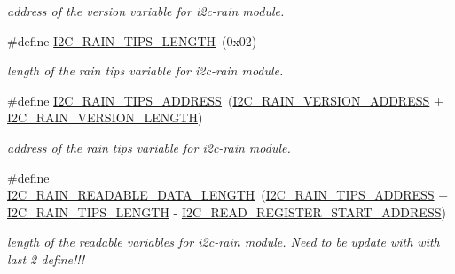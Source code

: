 \begin{DoxyCompactItemize}
\begin{DoxyCompactList}\small\item\em address of the version variable for i2c-\/rain module. \end{DoxyCompactList}\item 
\mbox{\label{registers-rain_8h_a2891a119589f6d2ea69bedc9656dc88d}} 
\#define \hyperlink{registers-rain_8h_a2891a119589f6d2ea69bedc9656dc88d}{I2\+C\+\_\+\+R\+A\+I\+N\+\_\+\+T\+I\+P\+S\+\_\+\+L\+E\+N\+G\+TH}~(0x02)
\begin{DoxyCompactList}\small\item\em length of the rain tips variable for i2c-\/rain module. \end{DoxyCompactList}\item 
\mbox{\label{registers-rain_8h_a338954266104a386be7cdb52adee3018}} 
\#define \hyperlink{registers-rain_8h_a338954266104a386be7cdb52adee3018}{I2\+C\+\_\+\+R\+A\+I\+N\+\_\+\+T\+I\+P\+S\+\_\+\+A\+D\+D\+R\+E\+SS}~(\hyperlink{registers-rain_8h_a9e52019667b12e9673b9d8dcf051ad71}{I2\+C\+\_\+\+R\+A\+I\+N\+\_\+\+V\+E\+R\+S\+I\+O\+N\+\_\+\+A\+D\+D\+R\+E\+SS} + \hyperlink{registers-rain_8h_a61a0b98368463356fd175c65ad070f70}{I2\+C\+\_\+\+R\+A\+I\+N\+\_\+\+V\+E\+R\+S\+I\+O\+N\+\_\+\+L\+E\+N\+G\+TH})
\begin{DoxyCompactList}\small\item\em address of the rain tips variable for i2c-\/rain module. \end{DoxyCompactList}\item 
\mbox{\label{registers-rain_8h_a54d09c3f3315e399f6cd7eb9c1ada389}} 
\#define \hyperlink{registers-rain_8h_a54d09c3f3315e399f6cd7eb9c1ada389}{I2\+C\+\_\+\+R\+A\+I\+N\+\_\+\+R\+E\+A\+D\+A\+B\+L\+E\+\_\+\+D\+A\+T\+A\+\_\+\+L\+E\+N\+G\+TH}~(\hyperlink{registers-rain_8h_a338954266104a386be7cdb52adee3018}{I2\+C\+\_\+\+R\+A\+I\+N\+\_\+\+T\+I\+P\+S\+\_\+\+A\+D\+D\+R\+E\+SS} + \hyperlink{registers-rain_8h_a2891a119589f6d2ea69bedc9656dc88d}{I2\+C\+\_\+\+R\+A\+I\+N\+\_\+\+T\+I\+P\+S\+\_\+\+L\+E\+N\+G\+TH} -\/ \hyperlink{registers_8h_ad04d1b7c138bbfcc7672f00defb5f312}{I2\+C\+\_\+\+R\+E\+A\+D\+\_\+\+R\+E\+G\+I\+S\+T\+E\+R\+\_\+\+S\+T\+A\+R\+T\+\_\+\+A\+D\+D\+R\+E\+SS})
\begin{DoxyCompactList}\small\item\em length of the readable variables for i2c-\/rain module. Need to be update with with last 2 define!!! \end{DoxyCompactList}\item 

\end{DoxyCompactItemize}
